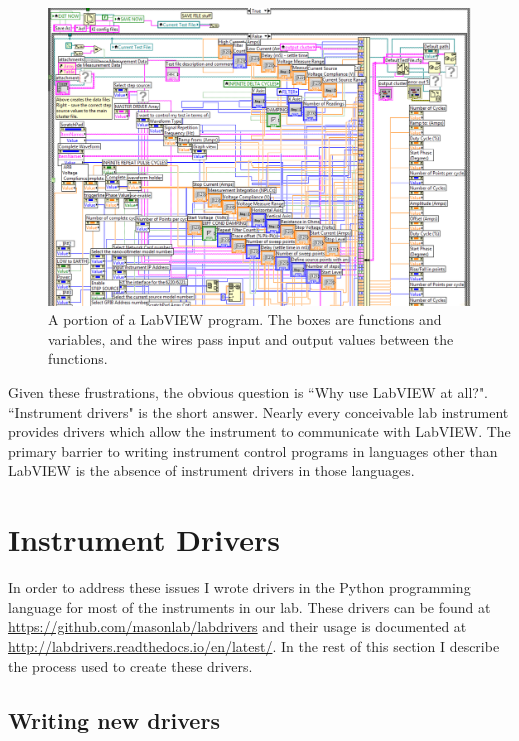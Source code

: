 \documentclass[edeposit,fullpage,draftthesis]{uiucthesis2009}
\begin{document}
\begin{appendices}
\begin{figure}
    \centering
    \includegraphics[width=\linewidth]{images/python/labview.png}
    \caption[Example LabVIEW program]{
        A portion of a LabVIEW program. The boxes are functions and variables, 
        and the wires pass input and output values between the functions.
    }
    \label{fig:labview}
\end{figure}
        
Given these frustrations, the obvious question is ``Why use LabVIEW at all?". ``Instrument drivers" is the short answer.
Nearly every conceivable lab instrument provides drivers which allow the instrument to communicate
with LabVIEW. The primary barrier to writing instrument control programs in languages other than
LabVIEW is the absence of instrument drivers in those languages.


\section{Instrument Drivers}

In order to address these issues I wrote drivers in the Python programming language
for most of the instruments in our lab. These drivers can be found at \url{https://github.com/masonlab/labdrivers}
and their usage is documented at \url{http://labdrivers.readthedocs.io/en/latest/}.
In the rest of this section I describe the process used to create these drivers.

    \subsection{Writing new drivers}
    

\end{appendices}
\end{document}
